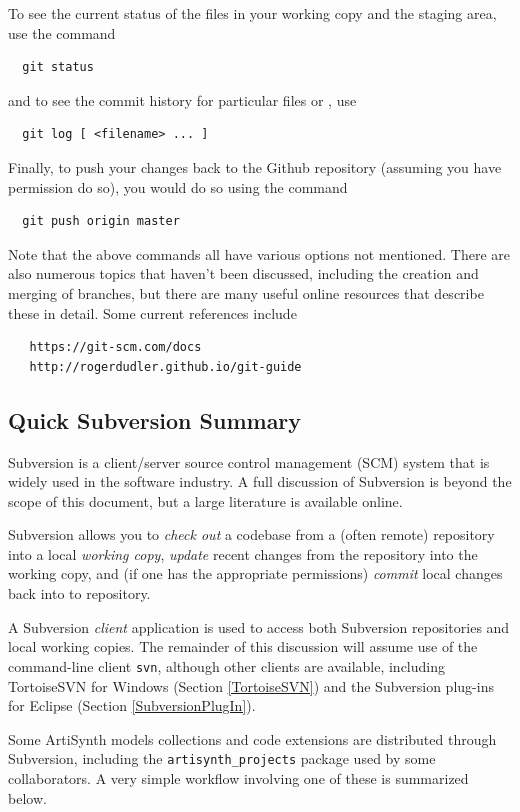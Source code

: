 To see the current status of the files in your working copy
and the staging area, use the command
\begin{verbatim}
  git status
\end{verbatim}
and to see the commit history for particular files or \directories{},
use 
\begin{verbatim}
  git log [ <filename> ... ]
\end{verbatim}

Finally, to push your changes back to the Github repository (assuming
you have permission do so), you would do so using the command
\begin{verbatim}
  git push origin master
\end{verbatim}

Note that the above commands all have various options not mentioned.
There are also numerous topics that haven't been discussed, including
the creation and merging of branches, but there are many useful online
resources that describe these in detail. Some current references
include
\begin{verbatim}
   https://git-scm.com/docs
   http://rogerdudler.github.io/git-guide
\end{verbatim}

\subsection{Quick Subversion Summary}
\label{SubversionSummary}

Subversion is a client/server source control management (SCM) system
that is widely used in the software industry.  A full discussion of
Subversion is beyond the scope of this document, but a large
literature is available online. 

Subversion allows you to {\it check out} a codebase from a (often
remote) repository into a local {\it working copy}, {\it update}
recent changes from the repository into the working copy, and (if one
has the appropriate permissions) {\it commit} local changes back into
to repository.

A Subversion {\it client} application is used to access both
Subversion repositories and local working copies. The remainder of
this discussion will assume use of the command-line client {\tt svn},
although other clients are available, including TortoiseSVN for
Windows 
\ifWindows
(Section \ref{TortoiseSVN}) 
\fi
and the Subversion plug-ins for
Eclipse (Section \ref{SubversionPlugIn}).

Some ArtiSynth models collections and code extensions are distributed
through Subversion, including the {\tt artisynth\_projects} package
used by some collaborators. A very simple workflow involving one of
these is summarized below.

